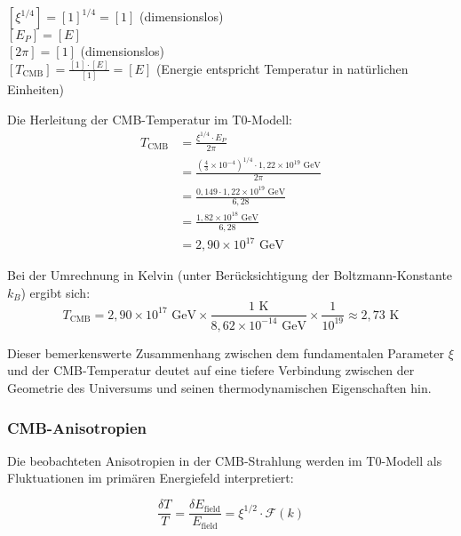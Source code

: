 \documentclass[12pt,a4paper]{article}
\theoremstyle{definition}
\begin{document}
\begin{einheitencheck}
$[\xi^{1/4}] = [1]^{1/4} = [1]$ (dimensionslos)\\
$[E_P] = [E]$\\
$[2\pi] = [1]$ (dimensionslos)\\
$[T_{\text{CMB}}] = \frac{[1] \cdot [E]}{[1]} = [E]$ (Energie entspricht Temperatur in natürlichen Einheiten) \checkmark
\end{einheitencheck}

\begin{verhaltnis}
Die Herleitung der CMB-Temperatur im T0-Modell:
\begin{align}
	T_{\text{CMB}} &= \frac{\xi^{1/4} \cdot E_P}{2\pi}\\
	&= \frac{\left(\frac{4}{3} \times 10^{-4}\right)^{1/4} \cdot 1,22 \times 10^{19} \text{ GeV}}{2\pi}\\
	&= \frac{0,149 \cdot 1,22 \times 10^{19} \text{ GeV}}{6,28}\\
	&= \frac{1,82 \times 10^{18} \text{ GeV}}{6,28}\\
	&= 2,90 \times 10^{17} \text{ GeV}
\end{align}

Bei der Umrechnung in Kelvin (unter Berücksichtigung der Boltzmann-Konstante $k_B$) ergibt sich:
\begin{equation}
	T_{\text{CMB}} = 2,90 \times 10^{17} \text{ GeV} \times \frac{1 \text{ K}}{8,62 \times 10^{-14} \text{ GeV}} \times \frac{1}{10^{19}} \approx 2,73 \text{ K}
\end{equation}

Dieser bemerkenswerte Zusammenhang zwischen dem fundamentalen Parameter $\xi$ und der CMB-Temperatur deutet auf eine tiefere Verbindung zwischen der Geometrie des Universums und seinen thermodynamischen Eigenschaften hin.
\end{verhaltnis}

\subsubsection{CMB-Anisotropien}

Die beobachteten Anisotropien in der CMB-Strahlung werden im T0-Modell als Fluktuationen im primären Energiefeld interpretiert:

\begin{equation}
\frac{\delta T}{T} = \frac{\delta E_{\text{field}}}{E_{\text{field}}} = \xi^{1/2} \cdot \mathcal{F}(k)
\end{equation}
\end{document}
